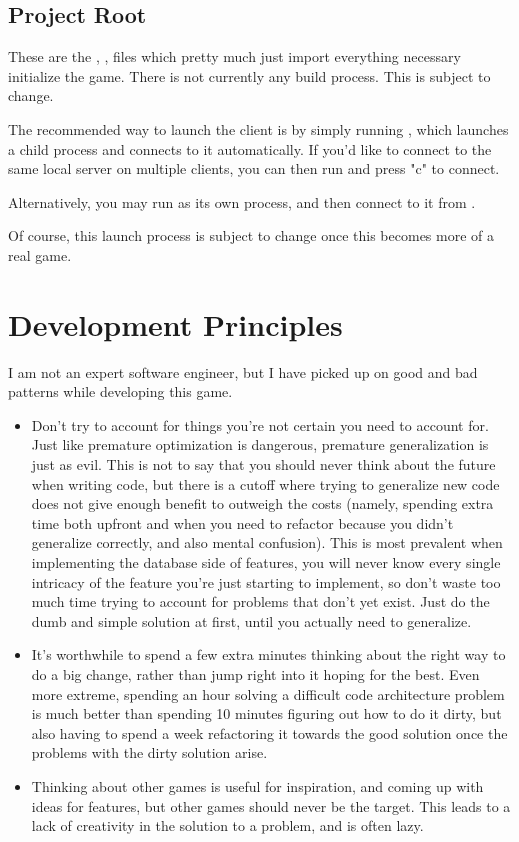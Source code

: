 \documentclass{article}
\begin{document}
\subsection{Project Root}
These are the , , 
files which pretty much just import everything necessary initialize the game. 
There is not currently any build process. This is subject to change.

The recommended way to launch the client is by simply running , which
launches a child  process and connects to it automatically.
If you'd like to connect to the same local server on multiple clients, you can then run
 and press "c" to connect.

Alternatively, you may run  as its own process, and then connect
to it from .

Of course, this launch process is subject to change once this becomes more of a real game.

\section{Development Principles}
I am not an expert software engineer, but I have picked up on good and bad patterns while developing
this game.
\begin{itemize}
    \item Don't try to account for things you're not certain you need to account for. Just like premature
        optimization is dangerous, premature generalization is just as evil. This is not to say that
        you should never think about the future when writing code, but there is a cutoff where trying
        to generalize new code does not give enough benefit to outweigh the costs (namely, spending
        extra time both upfront and when you need to refactor because you didn't generalize correctly,
        and also mental confusion). This is most prevalent when implementing the database side of
        features, you will never know every single intricacy of the feature you're just starting to
        implement, so don't waste too much time trying to account for problems that don't yet exist.
        Just do the dumb and simple solution at first, until you actually need to generalize.
    \item It's worthwhile to spend a few extra minutes thinking about the right way to do a big change,
        rather than jump right into it hoping for the best. Even more extreme, spending an hour
        solving a difficult code architecture problem is much better than spending 10 minutes figuring
        out how to do it dirty, but also having to spend a week refactoring it towards the good solution
        once the problems with the dirty solution arise.
    \item Thinking about other games is useful for inspiration, and coming up with ideas for features,
        but other games should never be the target. This leads to a lack of creativity in the solution
        to a problem, and is often lazy.
\end{itemize}
\end{document}
